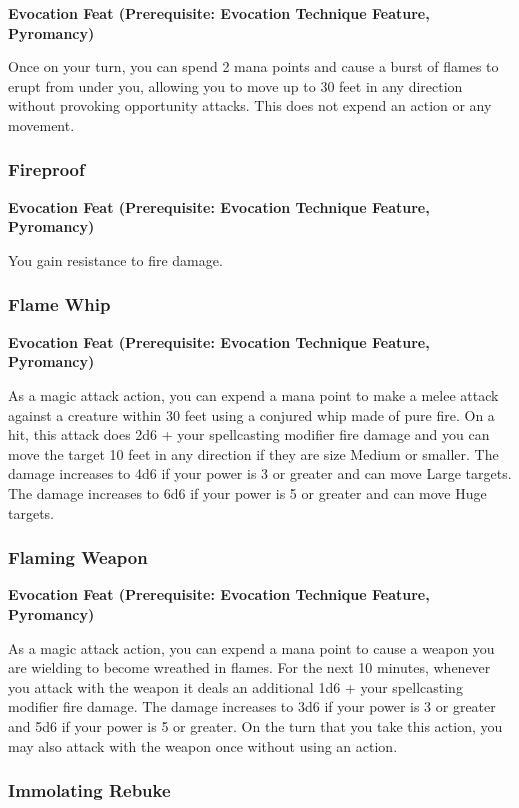 \documentclass[12pt,letterpaper,twocolumn,openany,nodeprecatedcode,bg=none]{dndbook}
\begin{document}
\textbf{Evocation Feat (Prerequisite: Evocation Technique Feature,
Pyromancy)}

Once on your turn, you can spend 2 mana points and cause a burst of
flames to erupt from under you, allowing you to move up to 30 feet in
any direction without provoking opportunity attacks. This does not
expend an action or any movement.

\subsubsection{Fireproof}\label{fireproof}

\textbf{Evocation Feat (Prerequisite: Evocation Technique Feature,
Pyromancy)}

You gain resistance to fire damage.

\subsubsection{Flame Whip}\label{flame-whip}

\textbf{Evocation Feat (Prerequisite: Evocation Technique Feature,
Pyromancy)}

As a magic attack action, you can expend a mana point to make a melee
attack against a creature within 30 feet using a conjured whip made of
pure fire. On a hit, this attack does 2d6 + your spellcasting modifier
fire damage and you can move the target 10 feet in any direction if they
are size Medium or smaller. The damage increases to 4d6 if your power is
3 or greater and can move Large targets. The damage increases to 6d6 if
your power is 5 or greater and can move Huge targets.

\subsubsection{Flaming Weapon}\label{flaming-weapon}

\textbf{Evocation Feat (Prerequisite: Evocation Technique Feature,
Pyromancy)}

As a magic attack action, you can expend a mana point to cause a weapon
you are wielding to become wreathed in flames. For the next 10 minutes,
whenever you attack with the weapon it deals an additional 1d6 + your
spellcasting modifier fire damage. The damage increases to 3d6 if your
power is 3 or greater and 5d6 if your power is 5 or greater. On the turn
that you take this action, you may also attack with the weapon once
without using an action.

\subsubsection{Immolating Rebuke}\label{immolating-rebuke}
\end{document}
